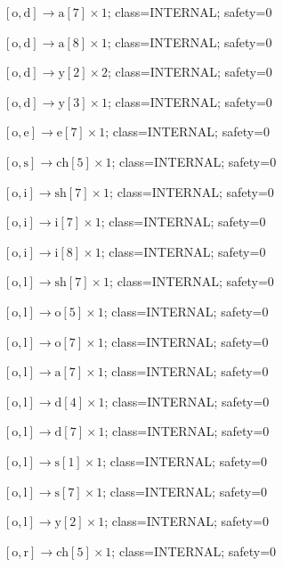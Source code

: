 \(\left[\mathrm{o}, \mathrm{d}\right] \to \mathrm{a}[7] \times 1\); class=INTERNAL; safety=0\par
\(\left[\mathrm{o}, \mathrm{d}\right] \to \mathrm{a}[8] \times 1\); class=INTERNAL; safety=0\par
\(\left[\mathrm{o}, \mathrm{d}\right] \to \mathrm{y}[2] \times 2\); class=INTERNAL; safety=0\par
\(\left[\mathrm{o}, \mathrm{d}\right] \to \mathrm{y}[3] \times 1\); class=INTERNAL; safety=0\par
\(\left[\mathrm{o}, \mathrm{e}\right] \to \mathrm{e}[7] \times 1\); class=INTERNAL; safety=0\par
\(\left[\mathrm{o}, \mathrm{s}\right] \to \mathrm{ch}[5] \times 1\); class=INTERNAL; safety=0\par
\(\left[\mathrm{o}, \mathrm{i}\right] \to \mathrm{sh}[7] \times 1\); class=INTERNAL; safety=0\par
\(\left[\mathrm{o}, \mathrm{i}\right] \to \mathrm{i}[7] \times 1\); class=INTERNAL; safety=0\par
\(\left[\mathrm{o}, \mathrm{i}\right] \to \mathrm{i}[8] \times 1\); class=INTERNAL; safety=0\par
\(\left[\mathrm{o}, \mathrm{l}\right] \to \mathrm{sh}[7] \times 1\); class=INTERNAL; safety=0\par
\(\left[\mathrm{o}, \mathrm{l}\right] \to \mathrm{o}[5] \times 1\); class=INTERNAL; safety=0\par
\(\left[\mathrm{o}, \mathrm{l}\right] \to \mathrm{o}[7] \times 1\); class=INTERNAL; safety=0\par
\(\left[\mathrm{o}, \mathrm{l}\right] \to \mathrm{a}[7] \times 1\); class=INTERNAL; safety=0\par
\(\left[\mathrm{o}, \mathrm{l}\right] \to \mathrm{d}[4] \times 1\); class=INTERNAL; safety=0\par
\(\left[\mathrm{o}, \mathrm{l}\right] \to \mathrm{d}[7] \times 1\); class=INTERNAL; safety=0\par
\(\left[\mathrm{o}, \mathrm{l}\right] \to \mathrm{s}[1] \times 1\); class=INTERNAL; safety=0\par
\(\left[\mathrm{o}, \mathrm{l}\right] \to \mathrm{s}[7] \times 1\); class=INTERNAL; safety=0\par
\(\left[\mathrm{o}, \mathrm{l}\right] \to \mathrm{y}[2] \times 1\); class=INTERNAL; safety=0\par
\(\left[\mathrm{o}, \mathrm{r}\right] \to \mathrm{ch}[5] \times 1\); class=INTERNAL; safety=0\par
